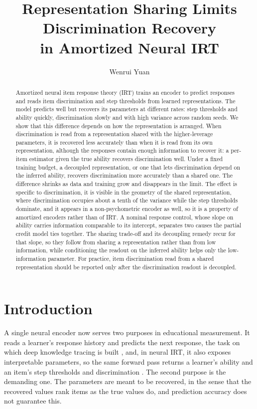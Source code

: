 \documentclass[twocolumn,10pt]{article}
\title{\vspace{-2em}Representation Sharing Limits Discrimination Recovery\\
in Amortized Neural IRT}
\author{Wenrui Yuan}
\date{}
\begin{document}
\maketitle

\begin{abstract}
Amortized neural item response theory (IRT) trains an encoder to predict responses and
reads item discrimination and step thresholds from learned representations. The model
predicts well but recovers its parameters at different rates: step thresholds and ability
quickly, discrimination slowly and with high variance across random seeds. We show that
this difference depends on how the representation is arranged. When discrimination is read
from a representation shared with the higher-leverage parameters, it is recovered less accurately
than when it is read from its own representation, although the responses contain enough
information to recover it: a per-item estimator given the true ability recovers
discrimination well. Under a fixed training budget, a decoupled representation, or one
that lets discrimination depend on the inferred ability, recovers discrimination more
accurately than a shared one. The difference shrinks as data and training grow and disappears in the
limit. The effect is specific to discrimination, it is visible in the geometry of the
shared representation, where discrimination occupies about a tenth of the variance while
the step thresholds dominate, and it appears in a non-psychometric encoder as well, so it
is a property of amortized encoders rather than of IRT.
A nominal response control, whose slope on ability carries information comparable to its
intercept, separates two causes the partial credit model ties together. The sharing
trade-off and its decoupling remedy recur for that slope, so they follow from sharing a
representation rather than from low information, while conditioning the readout on the
inferred ability helps only the low-information parameter.
For practice, item discrimination read from a shared representation should be reported
only after the discrimination readout is decoupled.
\end{abstract}

\section{Introduction}
A single neural encoder now serves two purposes in educational measurement. It reads a
learner's response history and predicts the next response, the task on which deep
knowledge tracing is built \citep{piech2015,zhang2017}, and, in neural IRT, it also
exposes interpretable parameters, so the same forward pass returns a learner's ability and
an item's step thresholds and discrimination \citep{yeung2019,wu2020}. The second purpose
is the demanding one. The parameters are meant to be recovered, in the sense that the
recovered values rank items as the true values do, and prediction accuracy does not
guarantee this.
\end{document}
